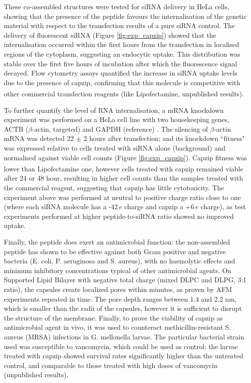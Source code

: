 These co-assembled structures were tested for siRNA delivery in HeLa cells, showing that the presence of the peptide favours the internalisation of the genetic material with respect to the transfection results of a pure siRNA control. The delivery of fluorescent siRNA (Figure \ref{fig:exp_capzip}) showed that the internalisation occurred within the first hours from the transfection in localised regions of the cytoplasm, suggesting an endocytic uptake. This distribution was stable over the first five hours of incubation after which the fluorescence signal decayed.
%
Flow cytometry assays quantified the increase in siRNA uptake levels due to the presence of capzip, confirming that this molecule is competitive with other commercial transfection reagents (like Lipofectamine\textsuperscript{\textregistered}, unpublished results).

To further quantify the level of RNA internalisation, a mRNA knockdown experiment was performed on a HeLa cell line with two housekeeping genes, ACTB ($\beta$-actin, targeted) and GAPDH (reference) \citep{Crombez2009}.
%
The silencing of $\beta$-actin mRNA was detected 22 $\pm$ 2 hours after transfection; and its knockdown ``fitness" was expressed relative to cells treated with siRNA alone (background) and normalised against viable cell counts (Figure \ref{fig:exp_capzip}). Capzip fitness was lower than Lipofectamine\textsuperscript{\textregistered} one, however cells treated with capzip remained viable after 24 or 48 hour, resulting in higher cell counts than the samples treated with the commercial reagent, suggesting that capzip has little cytotoxicity.
%
The experiment above was performed at neutral to positive charge ratio close to one (where each siRNA molecule has a -42$\, e$ charge and capzip a +6$\, e$ charge), as test experiments performed at higher peptide-to-siRNA ratio showed no improved uptake.

Finally, the peptide does exert an antimicrobial function: the non-assembled peptide has shown to be effective against both Gram positive and negative bacteria (E. coli, P. aeruginosa and S. aureus), with no haemolytic effects and minimum inhibitory concentrations typical of other antimicrobial agents.
%
On Supported Lipid Bilayer with negative total charge (mixed DLPC and DLPG, 3:1 ratio), the capsules create localized pores within minutes, as proven by AFM experiments repeated in time. The pore depth ranges between 1.4 and 2.2 nm, which is smaller than the radii of the capsules, however it is sufficient to disrupt the structure of the membrane.
%
Finally, to prove the viability of capzip as antimicrobial agent in vivo, it was used to counteract methicillin-resistant S. aureus (MRSA) infections in G. mellonella larvae. The particular bacterial strain used was susceptible to vancomycin, which could be used as control: the larvae treated with capzip showed survival rates significantly higher than the untreated control, and comparable to those treated with high doses of vancomycin (unpublished results).

